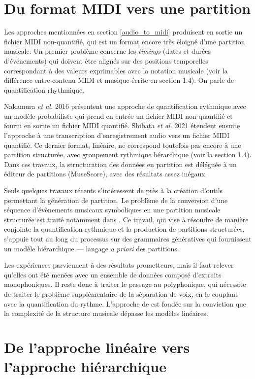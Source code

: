 \section{Du format MIDI vers une partition}
Les approches mentionnées en section \ref{audio_to_midi} produisent en sortie
un fichier MIDI non-quantifié, qui est un format encore très éloigné d’une
partition musicale. Un premier problème concerne les \textit{timings} (dates et durées
d’événements) qui doivent être alignés sur des positions temporelles
correspondant à des valeurs exprimables avec la notation musicale (voir la
différence entre contenu MIDI et musique écrite en section 1.4). On parle de
quantification rhythmique.

Nakamura \textit{et al.} 2016 présentent une approche de quantification rythmique avec
un modèle probabiliste qui prend en entrée un fichier MIDI non quantifié
et fourni en sortie un fichier MIDI quantifié. Shibata \textit{et al.} 2021 \cite{shibata} étendent
ensuite l’approche à une transcription d’enregistrement audio vers un fichier
MIDI quantifié. Ce dernier format, linéaire, ne correspond toutefois pas encore
à une partition structurée,  avec groupement rythmique hérarchique (voir la
section 1.4). Dans ces travaux, la structuration des données en partition est
déléguée à un éditeur de partitions (MuseScore), avec des résultats assez
inégaux.

Seuls quelques travaux récents s’intéressent de près à la création d’outils
permettant la génération de partition. Le problème de la conversion d’une
séquence d’évènements musicaux symboliques en une partition musicale structurée
est traité notamment dans \cite{foscarin}. Ce travail, qui vise à
résoudre de manière conjointe la quantification rythmique et la production de
partitions structurées, s’appuie tout au long du processus sur des grammaires
génératives qui fournissent un modèle hiérarchique — langage \textit{a priori} des
partitions.

Les expériences parviennent à des résultats prometteurs, mais il faut relever qu’elles
ont été menées avec un ensemble de données composé d’extraits monophoniques. Il
reste donc à traiter le passage au polyphonique, qui nécessite de traiter le
problème supplémentaire de la séparation de voix, en le couplant avec la
quantification du rythme. L’approche de \cite{foscarin} est fondée sur la
conviction que la complexité de la structure musicale dépasse les modèles
linéaires.

\section{De l’approche linéaire vers l’approche hiérarchique}

